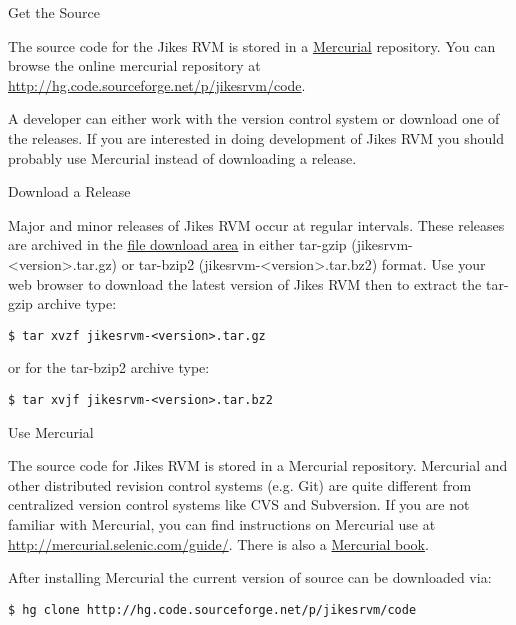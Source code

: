 \begin{section}{Get the Source}
\label{sec:getthesource}

The source code for the Jikes RVM is stored in a \href{http://mercurial.selenic.com/}{Mercurial} repository. You can browse the online mercurial repository at \url{http://hg.code.sourceforge.net/p/jikesrvm/code}.

A developer can either work with the version control system or download one of the releases. If you are interested in doing development of Jikes RVM you should probably use Mercurial instead of downloading a release.

\begin{subsection}{Download a Release}

Major and minor releases of Jikes RVM occur at regular intervals. These releases are archived in the \href{http://sourceforge.net/projects/jikesrvm/files/}{file download area} in either tar-gzip (jikesrvm-<version>.tar.gz) or tar-bzip2 (jikesrvm-<version>.tar.bz2) format. Use your web browser to download the latest version of Jikes RVM then to extract the tar-gzip archive type:

\begin{lstlisting}
$ tar xvzf jikesrvm-<version>.tar.gz
\end{lstlisting}

or for the tar-bzip2 archive type:

\begin{lstlisting}
$ tar xvjf jikesrvm-<version>.tar.bz2
\end{lstlisting}

\end{subsection}

\begin{subsection}{Use Mercurial}

The source code for Jikes RVM is stored in a Mercurial repository. Mercurial and other distributed revision control systems (e.g. Git) are quite different from centralized version control systems like CVS and Subversion. If you are not familiar with Mercurial, you can find instructions on Mercurial use at \url{http://mercurial.selenic.com/guide/}. There is also a \href{http://hgbook.red-bean.com/}{Mercurial book}.

After installing Mercurial the current version of source can be downloaded via:

\begin{lstlisting}
$ hg clone http://hg.code.sourceforge.net/p/jikesrvm/code
\end{lstlisting}


\end{subsection}
\end{section}
